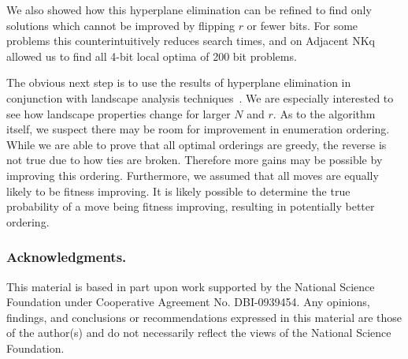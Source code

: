 \documentclass[runningheads,a4paper]{llncs}
\begin{document}
We also showed how this hyperplane elimination can be refined to find only solutions
which cannot be improved by flipping $r$ or fewer bits. For some problems
this counterintuitively reduces search times, and on Adjacent NKq allowed
us to find all 4-bit local optima of 200 bit problems.

The obvious next step is to use the results of hyperplane elimination
in conjunction with landscape analysis
techniques~\cite{tomassini:2008:nknetworks,verel:2011:nknetworks,ochoa:2015:crossovernetworks}.
We are especially interested to see how landscape properties change for larger $N$
and $r$. As to the algorithm itself, we suspect there may be room for improvement
in enumeration ordering. While we are able to prove that all optimal orderings
are greedy, the reverse is not true due to how ties are broken. Therefore more
gains may be possible by improving this ordering. Furthermore, we assumed
that all moves are equally likely to be fitness improving. It is likely possible
to determine the true probability of a move being fitness improving, resulting
in potentially better ordering.

\subsubsection*{Acknowledgments.}
This material is based in part upon work supported by the National Science Foundation
under Cooperative Agreement No. DBI-0939454. Any opinions, findings, and conclusions
or recommendations expressed in this material are those of the author(s) and do not
necessarily reflect the views of the National Science Foundation.



\end{document}
